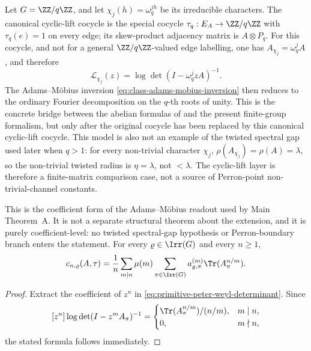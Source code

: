 \begin{remark}
  \label{rem:abelian-toy-model-cyclic}
  Let \(G=\ZZ/q\ZZ\), and let \(\chi_j(h)=\omega_q^{jh}\) be its
  irreducible characters. The canonical cyclic-lift cocycle is the
  special cocycle \(\tau_q:E_A\to\ZZ/q\ZZ\) with
  \(\tau_q(e)=1\) on every edge; its skew-product adjacency matrix is
  \(A\otimes P_q\). For this cocycle, and not for a general
  \(\ZZ/q\ZZ\)-valued edge labelling, one has
  \(A_{\chi_j}=\omega_q^jA\), and therefore
  \[
    \mathcal L_{\chi_j}(z)=\log\det(I-\omega_q^j zA)^{-1}.
  \]
  The Adams--M\"obius inversion
  \eqref{eq:class-adams-mobius-inversion} then reduces to the ordinary
  Fourier decomposition on the \(q\)-th roots of unity. This is the
  concrete bridge between the abelian formulas of
   and the present finite-group formalism, but
  only after the original cocycle has been replaced by this canonical
  cyclic-lift cocycle.
  This model is also not an example of the twisted spectral gap used
  later when \(q>1\): for every non-trivial character \(\chi_j\),
  \(\rho(A_{\chi_j})=\rho(A)=\lambda\), so the non-trivial twisted
  radius is \(\eta=\lambda\), not \(<\lambda\). The cyclic-lift layer is
  therefore a finite-matrix comparison case, not a source of
  Perron-point non-trivial-channel constants.
\end{remark}

\begin{theorem}
  \label{thm:primitive-peter-weyl-trace}
  This is the coefficient form of the Adams--M\"obius readout used by Main
  Theorem~A.  It is not a separate structural theorem about the extension, and
  it is purely coefficient-level: no twisted spectral-gap hypothesis or
  Perron-boundary branch enters the statement.
  For every \(\varrho\in\Irr(G)\) and every \(n\ge 1\),
  \begin{equation}\label{eq:primitive-peter-weyl-trace}
    c_{n,\varrho}(A,\tau)
    =
    \frac{1}{n}\sum_{m\mid n}\mu(m)
      \sum_{\pi\in\Irr(G)}
        a_{\varrho,\pi}^{(m)}
        \Tr(A_\pi^{n/m}).
  \end{equation}
\end{theorem}

\begin{proof}
  Extract the coefficient of \(z^n\) in
  \eqref{eq:primitive-peter-weyl-determinant}. Since
  \[
    [z^n]\log\det(I-z^mA_\pi)^{-1}
    =
    \begin{cases}
      \Tr(A_\pi^{n/m})/(n/m), & m\mid n, \\
      0, & m\nmid n,
    \end{cases}
  \]
  the stated formula follows immediately.
\end{proof}

